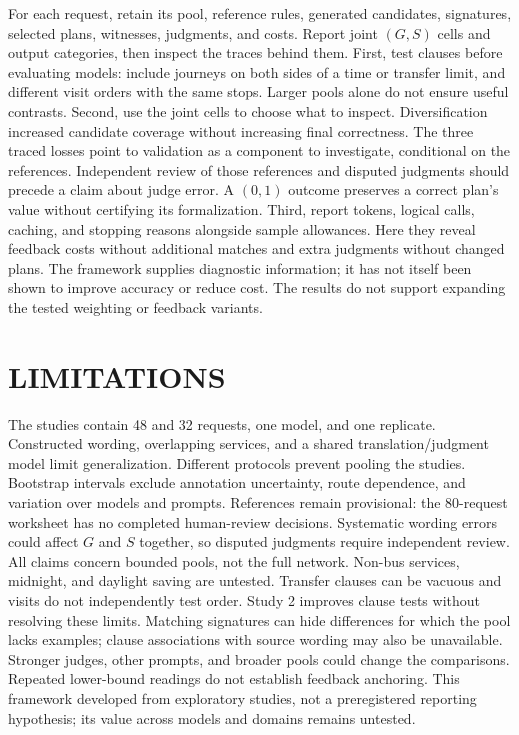 \documentclass[a4paper,twoside]{article}
\begin{document}
\noindent For each request, retain its pool, reference rules, generated candidates, signatures, selected plans, witnesses, judgments, and costs. Report joint $(G,S)$ cells and output categories, then inspect the traces behind them.
First, test clauses before evaluating models: include journeys on both sides of a time or transfer limit, and different visit orders with the same stops. Larger pools alone do not ensure useful contrasts.
Second, use the joint cells to choose what to inspect. Diversification increased candidate coverage without increasing final correctness. The three traced losses point to validation as a component to investigate, conditional on the references. Independent review of those references and disputed judgments should precede a claim about judge error. A $(0,1)$ outcome preserves a correct plan's value without certifying its formalization.
Third, report tokens, logical calls, caching, and stopping reasons alongside sample allowances. Here they reveal feedback costs without additional matches and extra judgments without changed plans.
The framework supplies diagnostic information; it has not itself been shown to improve accuracy or reduce cost. The results do not support expanding the tested weighting or feedback variants.


\section{\uppercase{Limitations}}
\label{sec:limitations}


\noindent The studies contain 48 and 32 requests, one model, and one replicate. Constructed wording, overlapping services, and a shared translation/judgment model limit generalization. Different protocols prevent pooling the studies. Bootstrap intervals exclude annotation uncertainty, route dependence, and variation over models and prompts.
References remain provisional: the 80-request worksheet has no completed human-review decisions. Systematic wording errors could affect $G$ and $S$ together, so disputed judgments require independent review.
All claims concern bounded pools, not the full network. Non-bus services, midnight, and daylight saving are untested. Transfer clauses can be vacuous and visits do not independently test order. Study 2 improves clause tests without resolving these limits. Matching signatures can hide differences for which the pool lacks examples; clause associations with source wording may also be unavailable.
Stronger judges, other prompts, and broader pools could change the comparisons. Repeated lower-bound readings do not establish feedback anchoring. This framework developed from exploratory studies, not a preregistered reporting hypothesis; its value across models and domains remains untested.
\end{document}
